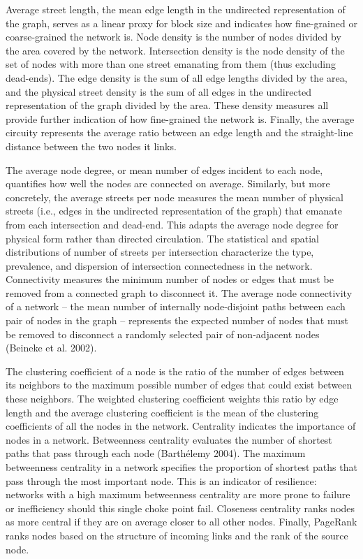 \documentclass[Afour,sageh,times]{sage/sagej}
\begin{document}
Average street length, the mean edge length in the undirected representation of the graph, serves as a linear proxy for block size and indicates how fine-grained or coarse-grained the network is. Node density is the number of nodes divided by the area covered by the network. Intersection density is the node density of the set of nodes with more than one street emanating from them (thus excluding dead-ends). The edge density is the sum of all edge lengths divided by the area, and the physical street density is the sum of all edges in the undirected representation of the graph divided by the area. These density measures all provide further indication of how fine-grained the network is. Finally, the average circuity represents the average ratio between an edge length and the straight-line distance between the two nodes it links.

The average node degree, or mean number of edges incident to each node, quantifies how well the nodes are connected on average. Similarly, but more concretely, the average streets per node measures the mean number of physical streets (i.e., edges in the undirected representation of the graph) that emanate from each intersection and dead-end. This adapts the average node degree for physical form rather than directed circulation. The statistical and spatial distributions of number of streets per intersection characterize the type, prevalence, and dispersion of intersection connectedness in the network. Connectivity measures the minimum number of nodes or edges that must be removed from a connected graph to disconnect it. The average node connectivity of a network – the mean number of internally node-disjoint paths between each pair of nodes in the graph – represents the expected number of nodes that must be removed to disconnect a randomly selected pair of non-adjacent nodes (Beineke et al. 2002). 

The clustering coefficient of a node is the ratio of the number of edges between its neighbors to the maximum possible number of edges that could exist between these neighbors. The weighted clustering coefficient weights this ratio by edge length and the average clustering coefficient is the mean of the clustering coefficients of all the nodes in the network. Centrality indicates the importance of nodes in a network. Betweenness centrality evaluates the number of shortest paths that pass through each node (Barthélemy 2004). The maximum betweenness centrality in a network specifies the proportion of shortest paths that pass through the most important node. This is an indicator of resilience: networks with a high maximum betweenness centrality are more prone to failure or inefficiency should this single choke point fail. Closeness centrality ranks nodes as more central if they are on average closer to all other nodes. Finally, PageRank ranks nodes based on the structure of incoming links and the rank of the source node.
\end{document}

